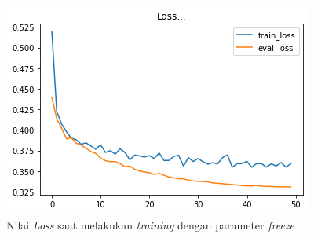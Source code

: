 \begin{figure}[h]
    \begin{center}
        \includegraphics[width= 0.9\linewidth]{gambar/loss_freeze_50.png}
        \caption{Nilai \textit{Loss} saat melakukan \textit{training} dengan parameter \textit{freeze}}
        \label{fig: loss_freeze}
    \end{center}
\end{figure}

